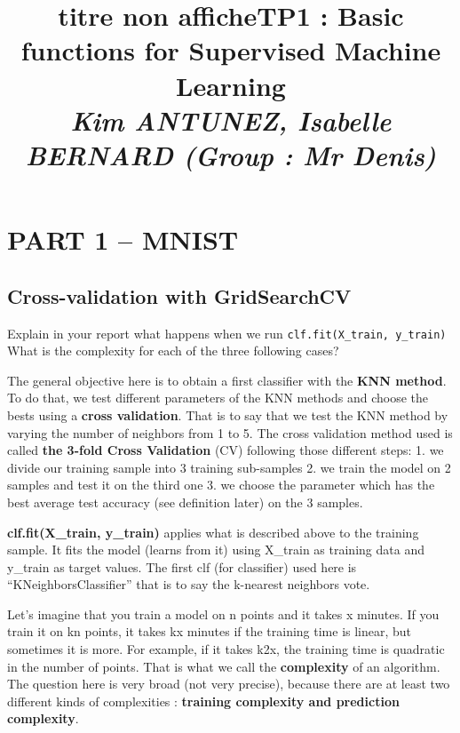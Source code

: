 \documentclass[10pt,a4paper]{article}
\title{titre non affiche}
\author{}
\date{}
\title{\textbf{TP1 : Basic functions for Supervised Machine Learning  } \medskip \\ \large \emph{Kim ANTUNEZ, Isabelle BERNARD (Group : Mr Denis)}}
\author{}
\theoremstyle{break}
\begin{document}
\maketitle


\vspace{-20truemm}

\hypertarget{part-1-mnist}{%
\section{PART 1 -- MNIST}\label{part-1-mnist}}

\hypertarget{cross-validation-with-gridsearchcv}{%
\subsection{Cross-validation with GridSearchCV}\label{cross-validation-with-gridsearchcv}}

\begin{tcolorbox}

Explain in your report what happens when we run \texttt{clf.fit(X\_train,\ y\_train)}
What is the complexity for each of the three following cases?

\end{tcolorbox}

The general objective here is to obtain a first classifier with the \textbf{KNN method}. To do that, we test different parameters of the KNN methods and choose the bests using a \textbf{cross validation}. That is to say that we test the KNN method by varying the number of neighbors from 1 to 5. The cross validation method used is called \textbf{the 3-fold Cross Validation} (CV) following those different steps:
1. we divide our training sample into 3 training sub-samples
2. we train the model on 2 samples and test it on the third one
3. we choose the parameter which has the best average test accuracy (see definition later) on the 3 samples.

\textbf{clf.fit(X\_train, y\_train)} applies what is described above to the training sample. It fits the model (learns from it) using X\_train as training data and y\_train as target values. The first clf (for classifier) used here is ``KNeighborsClassifier'' that is to say the k-nearest neighbors vote.

Let's imagine that you train a model on n points and it takes x minutes. If you train it on kn points, it takes kx minutes if the training time is linear, but sometimes it is more. For example, if it takes k2x, the training time is quadratic in the number of points. That is what we call the \textbf{complexity} of an algorithm. The question here is very broad (not very precise), because there are at least two different kinds of complexities : \textbf{training complexity and prediction complexity}.
\end{document}
